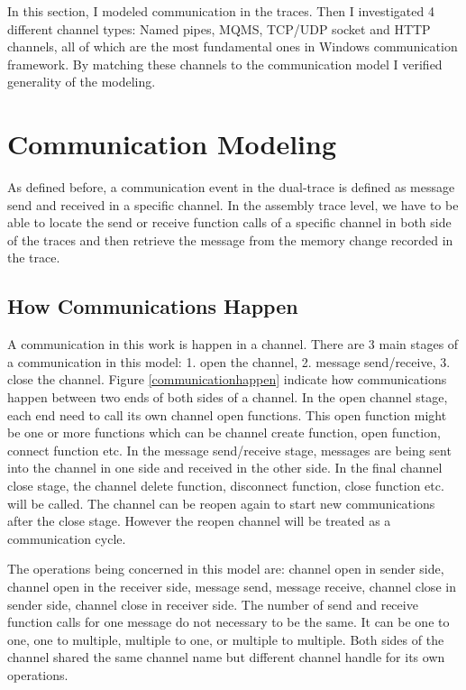 \label{chapter:Mod}
In this section, I modeled communication in the traces. Then I investigated 4 different channel types: Named pipes, MQMS, TCP/UDP socket and HTTP channels, all of which are the most fundamental ones in Windows communication framework. By matching these channels to the communication model I verified generality of the modeling. 

\section{Communication Modeling}\label{commod}
As defined before, a communication event in the dual-trace is defined as message send and received in a specific channel. In the assembly trace level, we have to be able to locate the send or receive function calls of a specific channel in both side of the traces and then retrieve the message from the memory change recorded in the trace. 
\subsection{How Communications Happen}   
A communication in this work is happen in a channel. There are 3 main stages of a communication in this model: 1. open the channel, 2. message send/receive, 3. close the channel. Figure \ref{communicationhappen} indicate how communications happen between two ends of both sides of a channel. In the open channel stage, each end need to call its own channel open functions. This open function might be one or more functions which can be channel create function, open function, connect function etc.  In the message send/receive stage, messages are being sent into the channel in one side and received in the other side. In the final channel close stage, the channel delete function, disconnect function, close function etc. will be called. The channel can be reopen again to start new communications after the close stage. However the reopen channel will be treated as a communication cycle.

The operations being concerned in this model are: channel open in sender side, channel open in the receiver side, message send, message receive, channel close in sender side, channel close in receiver side. The number of send and receive function calls for one message do not necessary to be the same. It can be one to one, one to multiple, multiple to one, or multiple to multiple. Both sides of the channel shared the same channel name but different channel handle for its own operations.

